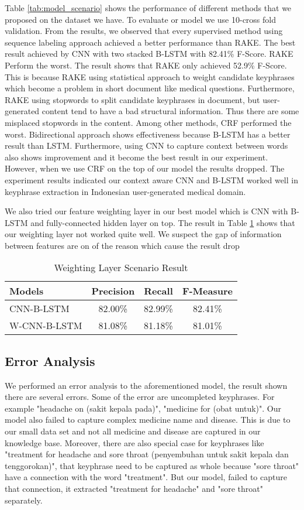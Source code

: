 Table \ref{tab:model_scenario} shows the performance of different methods that we proposed on the dataset we have. To evaluate or model we use 10-cross fold validation. From the results, we observed that every supervised method using sequence labeling approach achieved a better performance than RAKE. The best result achieved by CNN with two stacked B-LSTM with 82.41\% F-Score. RAKE Perform the worst. The result shows that RAKE only achieved 52.9\% F-Score. This is because RAKE using statistical approach to weight candidate keyphrases which become a problem in short document like medical questions. Furthermore, RAKE using stopwords to split candidate keyphrases in document, but user-generated content tend to have a bad structural information. Thus there are some misplaced stopwords in the content. Among other methods, CRF performed the worst. Bidirectional approach shows effectiveness because B-LSTM has a better result than LSTM. Furthermore, using CNN to capture context between words also shows improvement and it become the best result in our experiment. However, when we use CRF on the top of our model the results dropped. The experiment results indicated our context aware CNN and B-LSTM worked well in keyphrase extraction in Indonesian user-generated medical domain. 

We also tried our feature weighting layer in our best model which is CNN with B-LSTM and fully-connected hidden layer on top. The result in Table \ref{tab:weighting_scenario} shows that our weighting layer not worked quite well. We suspect the gap of information between features are on of the reason which cause the result drop
\begin{table}
	\caption{Weighting Layer Scenario Result}
	\label{tab:weighting_scenario}
	\begin{tabular}{lccc}
		\toprule
		Models&Precision&Recall&F-Measure\\
		\midrule
		CNN-B-LSTM & 82.00\% & 82.99\% & 82.41\% \\
		
		W-CNN-B-LSTM & 81.08\% & 81.18\% & 81.01\% \\
		\bottomrule
	\end{tabular}
\end{table}
\subsection{Error Analysis}
We performed an error analysis to the aforementioned model, the result shown there are several errors. Some of the error are uncompleted keyphrases. For example "headache on (sakit kepala pada)", "medicine for (obat untuk)". Our model also failed to capture complex medicine name and disease. This is due to our small data set and not all medicine and disease are captured in our knowledge base. Moreover, there are also special case for keyphrases like "treatment for headache and sore throat (penyembuhan untuk sakit kepala dan tenggorokan)", that keyphrase need to be captured as whole because "sore throat" have a connection with the word "treatment". But our model, failed to capture that connection, it extracted "treatment for headache" and "sore throat" separately.
